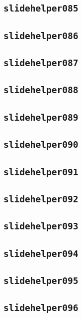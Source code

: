 \subsection{\texttt{slidehelper085}}
\newpage
\subsection{\texttt{slidehelper086}}
\newpage
\subsection{\texttt{slidehelper087}}
\newpage
\subsection{\texttt{slidehelper088}}
\newpage
\subsection{\texttt{slidehelper089}}
\newpage
\subsection{\texttt{slidehelper090}}
\newpage
\subsection{\texttt{slidehelper091}}
\newpage
\subsection{\texttt{slidehelper092}}
\newpage
\subsection{\texttt{slidehelper093}}
\newpage
\subsection{\texttt{slidehelper094}}
\newpage
\subsection{\texttt{slidehelper095}}
\newpage
\subsection{\texttt{slidehelper096}}
\newpage
